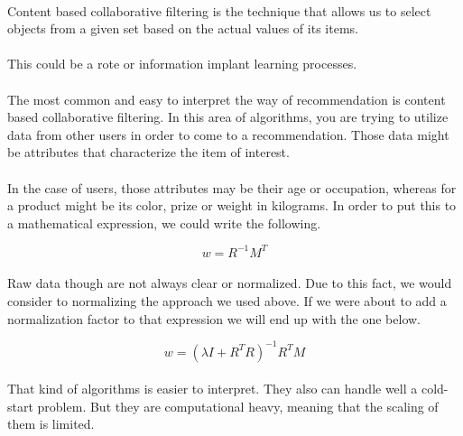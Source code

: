 \paragraph{}Content based collaborative filtering is the technique that allows us to select objects from a given set based on the actual values of its items.
\paragraph{} This could be a rote or information implant learning processes.

\paragraph{}The most common and easy to interpret the way of recommendation is content based collaborative filtering. In this area of algorithms, you are trying to utilize data from other users in order to come to a recommendation. Those data might be attributes that characterize the item of interest. 
\paragraph{}In the case of users, those attributes may be their age or occupation, whereas for a product might be its color, prize or weight in kilograms. In order to put this to a mathematical expression, we could write the following.

\begin{equation}
w=R^{-1}M^{T}
\end{equation}

\paragraph{}Raw data though are not always clear or normalized. Due to this fact, we would consider to normalizing the approach we used above. If we were about to add a normalization factor to that expression we will end up with the one below.

\begin{equation}
w=(\lambda I + R^{T}R)^{-1} R^{T}M 
\end{equation}

\paragraph{}That kind of algorithms is easier to interpret. They also can handle well a cold-start problem. But they are computational heavy, meaning that the scaling of them is limited.

